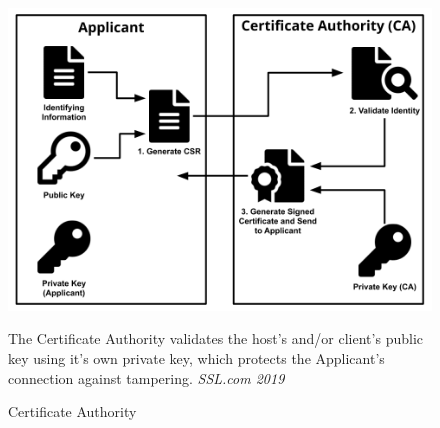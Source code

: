 \documentclass[12pt]{article}
\begin{document}
\begin{figure}[ht]
    \hspace{0.75cm}
    \begin{minipage}[c]{0.45\textwidth}
        \includegraphics[width=\textwidth]{ca_diagram.png}
    \end{minipage}
    \begin{minipage}[c]{0.4\textwidth}
        \caption{Certificate Authority}
        \label{CA}%
        \sffamily\footnotesize The Certificate Authority validates the host's and/or client's public key using it's own private key, which protects the Applicant's connection against tampering.
        \scriptsize\textcopyright\rmfamily\textit{SSL.com 2019}
    \end{minipage}
\end{figure}
\end{document}
